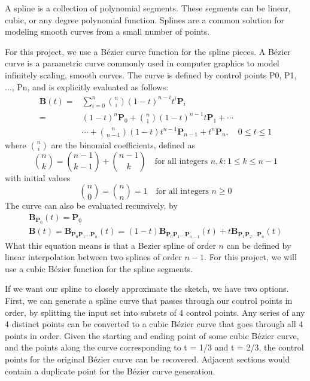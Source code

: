 \documentclass[12pt]{report}
\begin{document}
A spline is a collection of polynomial segments.
These segments can be linear, cubic, or any degree polynomial function.
Splines are a common solution for modeling smooth curves from a small number of points.

For this project, we use a Bézier curve function for the spline pieces.
A Bézier curve is a parametric curve commonly used in computer graphics to model infinitely scaling, smooth curves.
The curve is defined by control points P0, P1, ..., Pn, and is explicitly evaluated as follows:
\begin{align}
  \mathbf{B}(t) = {} &\sum_{i=0}^n {n\choose i}(1 - t)^{n - i}t^i\mathbf{P}_i \\
                = {} &(1 - t)^n\mathbf{P}_0 + {n\choose 1}(1 - t)^{n - 1}t\mathbf{P}_1 + \cdots \\
                  {} &\cdots + {n\choose n - 1}(1 - t)t^{n - 1}\mathbf{P}_{n - 1} + t^n\mathbf{P}_n,\quad 0 \le t \le 1
\end{align}
where $\scriptstyle {n \choose i}$ are the binomial coefficients, defined as
\begin{equation}
\binom nk = \binom{n-1}{k-1} + \binom{n-1}k \quad \text{for all integers }n,k : 1\le k\le n-1
\end{equation}
with initial values 
\begin{equation}
\binom n0 = \binom nn = 1 \quad \text{for all integers } n\ge0
\end{equation}
The curve can also be evaluated recursively, by
\begin{align}
\mathbf{B}_{\mathbf{P}_0}(t) = \mathbf{P}_0 \\
\mathbf{B}(t) = \mathbf{B}_{\mathbf{P}_0\mathbf{P}_1\ldots\mathbf{P}_n}(t) = (1-t)\mathbf{B}_{\mathbf{P}_0\mathbf{P}_1\ldots\mathbf{P}_{n-1}}(t) + t\mathbf{B}_{\mathbf{P}_1\mathbf{P}_2\ldots\mathbf{P}_n}(t)
\end{align}
What this equation means is that a Bezier spline of order $n$ can be defined by linear interpolation between two splines of order $n - 1$.
For this project, we will use a cubic Bézier function for the spline segments.

If we want our spline to closely approximate the sketch, we have two options. 
First, we can generate a spline curve that passes through our control points in order, by splitting the input set into subsets of 4 control points.
Any series of any 4 distinct points can be converted to a cubic Bézier curve that goes through all 4 points in order.
Given the starting and ending point of some cubic Bézier curve, and the points along the curve corresponding to t = 1/3 and t = 2/3, the control points for the original Bézier curve can be recovered.
Adjacent sections would contain a duplicate point for the Bézier curve generation.
\end{document}
